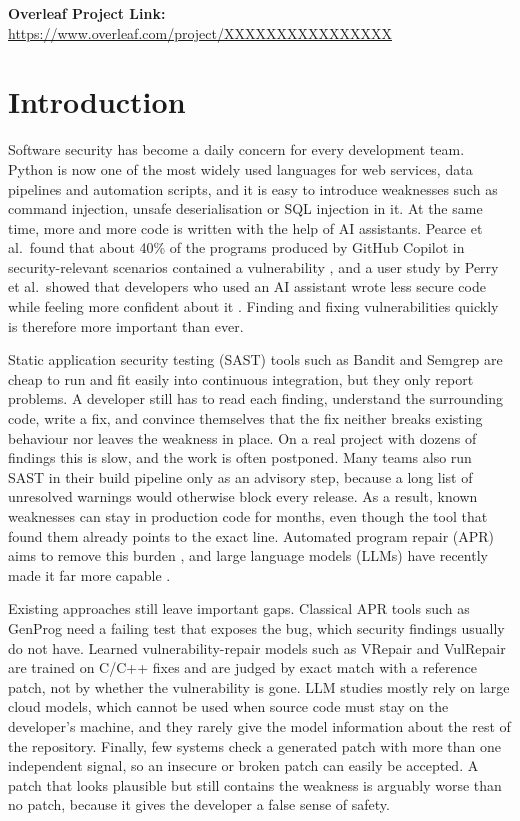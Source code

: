 \documentclass[12pt,onecolumn,draftclsnofoot]{IEEEtran}
\begin{document}
\noindent\textbf{Overleaf Project Link:} \url{https://www.overleaf.com/project/XXXXXXXXXXXXXXXX}

\section{Introduction}
Software security has become a daily concern for every development team. Python is now one of the most widely used languages for web services, data pipelines and automation scripts, and it is easy to introduce weaknesses such as command injection, unsafe deserialisation or SQL injection in it. At the same time, more and more code is written with the help of AI assistants. Pearce et al.\ found that about 40\% of the programs produced by GitHub Copilot in security-relevant scenarios contained a vulnerability \cite{pearce2022asleep}, and a user study by Perry et al.\ showed that developers who used an AI assistant wrote less secure code while feeling more confident about it \cite{perry2023users}. Finding and fixing vulnerabilities quickly is therefore more important than ever.

Static application security testing (SAST) tools such as Bandit \cite{bandit} and Semgrep \cite{semgrep} are cheap to run and fit easily into continuous integration, but they only report problems. A developer still has to read each finding, understand the surrounding code, write a fix, and convince themselves that the fix neither breaks existing behaviour nor leaves the weakness in place. On a real project with dozens of findings this is slow, and the work is often postponed. Many teams also run SAST in their build pipeline only as an advisory step, because a long list of unresolved warnings would otherwise block every release. As a result, known weaknesses can stay in production code for months, even though the tool that found them already points to the exact line. Automated program repair (APR) aims to remove this burden \cite{legoues2019apr, monperrus2018bibliography}, and large language models (LLMs) have recently made it far more capable \cite{xia2023apr, jiang2023impact}.

Existing approaches still leave important gaps. Classical APR tools such as GenProg \cite{legoues2012genprog} need a failing test that exposes the bug, which security findings usually do not have. Learned vulnerability-repair models such as VRepair \cite{chen2023vrepair} and VulRepair \cite{fu2022vulrepair} are trained on C/C++ fixes and are judged by exact match with a reference patch, not by whether the vulnerability is gone. LLM studies \cite{pearce2023zeroshot, wu2023effective} mostly rely on large cloud models, which cannot be used when source code must stay on the developer's machine, and they rarely give the model information about the rest of the repository. Finally, few systems check a generated patch with more than one independent signal, so an insecure or broken patch can easily be accepted. A patch that looks plausible but still contains the weakness is arguably worse than no patch, because it gives the developer a false sense of safety.
\end{document}
